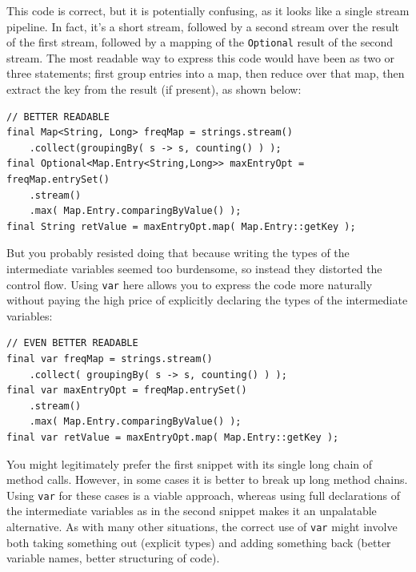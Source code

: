 \documentclass[11pt,a4paper, titlepage, parskip=half, headsepline, footsepline, cleardoublepage=current, headheight=1cm]{scrbook}
\begin{document}
\begin{itemize}
{This code is correct, but it is potentially confusing, as it looks like a single stream pipeline. In fact, it’s a short stream, followed by a second stream over the result of the first stream, followed by a mapping of the \lstinline|Optional|\autocite{ORACLE_DOC_OPTIONAL_CLASS} result of the second stream. The most readable way to express this code would have been as two or three statements; first group entries into a map, then reduce over that map, then extract the key from the result (if present), as shown below:
\begin{lstlisting}
// BETTER READABLE
final Map<String, Long> freqMap = strings.stream()
    .collect(groupingBy( s -> s, counting() ) );
final Optional<Map.Entry<String,Long>> maxEntryOpt = freqMap.entrySet()
    .stream()
    .max( Map.Entry.comparingByValue() );
final String retValue = maxEntryOpt.map( Map.Entry::getKey );
\end{lstlisting}

But you probably resisted doing that because writing the types of the intermediate variables seemed too burdensome, so instead they distorted the control flow. Using \lstinline|var| here allows you to express the code more naturally without paying the high price of explicitly declaring the types of the intermediate variables:
\begin{lstlisting}
// EVEN BETTER READABLE
final var freqMap = strings.stream()
    .collect( groupingBy( s -> s, counting() ) );
final var maxEntryOpt = freqMap.entrySet()
    .stream()
    .max( Map.Entry.comparingByValue() );
final var retValue = maxEntryOpt.map( Map.Entry::getKey );
\end{lstlisting}

You might legitimately prefer the first snippet with its single long chain of method calls. However, in some cases it is better to break up long method chains. Using \lstinline|var| for these cases is a viable approach, whereas using full declarations of the intermediate variables as in the second snippet makes it an unpalatable alternative. As with many other situations, the correct use of \lstinline|var| might involve both taking something out (explicit types) and adding something back (better variable names, better structuring of code).}
\end{itemize}
\end{document}
